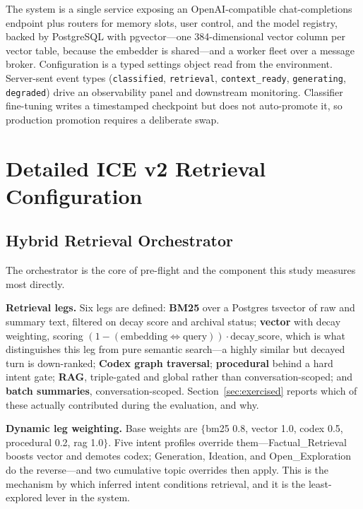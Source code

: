 \documentclass[11pt,a4paper]{article}
\begin{document}
The system is a single service exposing an OpenAI-compatible chat-completions endpoint plus routers for memory slots, user control, and the model registry, backed by PostgreSQL with pgvector---one 384-dimensional vector column per vector table, because the embedder is shared---and a worker fleet over a message broker. Configuration is a typed settings object read from the environment. Server-sent event types (\texttt{classified}, \texttt{retrieval}, \texttt{context\_ready}, \texttt{generating}, \texttt{degraded}) drive an observability panel and downstream monitoring. Classifier fine-tuning writes a timestamped checkpoint but does not auto-promote it, so production promotion requires a deliberate swap.


\FloatBarrier
\section{Detailed ICE v2 Retrieval Configuration}
\subsection{Hybrid Retrieval Orchestrator}
\label{app:orchestrator}

The orchestrator is the core of pre-flight and the component this study measures most directly.

\textbf{Retrieval legs.} Six legs are defined: \textbf{BM25} over a Postgres tsvector of raw and summary text, filtered on decay score and archival status; \textbf{vector} with decay weighting, scoring $(1 - (\text{embedding} \Leftrightarrow \text{query}))\cdot\text{decay\_score}$, which is what distinguishes this leg from pure semantic search---a highly similar but decayed turn is down-ranked; \textbf{Codex graph traversal}; \textbf{procedural} behind a hard intent gate; \textbf{RAG}, triple-gated and global rather than conversation-scoped; and \textbf{batch summaries}, conversation-scoped. Section~\ref{sec:exercised} reports which of these actually contributed during the evaluation, and why.

\textbf{Dynamic leg weighting.} Base weights are $\{$bm25 0.8, vector 1.0, codex 0.5, procedural 0.2, rag 1.0$\}$. Five intent profiles override them---Factual\_Retrieval boosts vector and demotes codex; Generation, Ideation, and Open\_Exploration do the reverse---and two cumulative topic overrides then apply. This is the mechanism by which inferred intent conditions retrieval, and it is the least-explored lever in the system.
\end{document}
